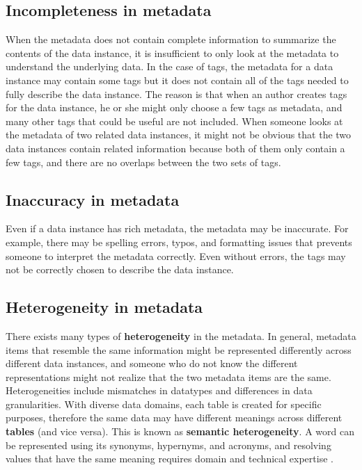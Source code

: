 \subsection{Incompleteness in metadata}

When the metadata does not contain complete information to summarize the contents of the data instance, it is insufficient to only look at the metadata to understand the underlying data. In the case of tags, the metadata for a data instance may contain some tags but it does not contain all of the tags needed to fully describe the data instance. The reason is that when an author creates tags for the data instance, he or she might only choose a few tags as metadata, and many other tags that could be useful are not included. When someone looks at the metadata of two related data instances, it might not be obvious that the two data instances contain related information because both of them only contain a few tags, and there are no overlaps between the two sets of tags.

\subsection{Inaccuracy in metadata}

Even if a data instance has rich metadata, the metadata may be inaccurate. For example, there may be spelling errors, typos, and formatting issues that prevents someone to interpret the metadata correctly. Even without errors, the tags may not be correctly chosen to describe the data instance.

\subsection{Heterogeneity in metadata}

There exists many types of \textbf{\gls{heterogeneity}} in the metadata. In general, metadata items that resemble the same information might be represented differently across different data instances, and someone who do not know the different representations might not realize that the two metadata items are the same. Heterogeneities include mismatches in datatypes and differences in data granularities. With diverse data domains, each table is created for specific purposes, therefore the same data may have different meanings across different \textbf{\glspl{table}} (and vice versa). This is known as \textbf{\gls{semantic heterogeneity}}. A word can be represented using its synonyms, hypernyms, and acronyms, and resolving values that have the same meaning requires domain and technical expertise \cite{Halevy2005Why}.

